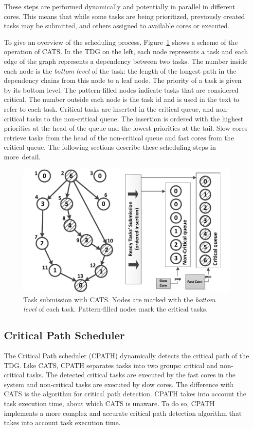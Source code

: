 These steps are performed dynamically and potentially in parallel in different cores. This means that while some tasks are being prioritized, previously created tasks may be submitted, and others assigned to available cores or executed.

To give an overview of the scheduling process, Figure~\ref{botlevels} shows a scheme of the operation of CATS. In the TDG on the left, each node represents a task and each edge of the graph represents a dependency between two tasks. The number inside each node is the \textit{bottom level} of the task: the length of the longest path in the dependency chains from this node to a leaf node. The priority of a task is given by its bottom level. The pattern-filled nodes indicate tasks that are considered critical. The number outside each node is the task id and is used in the text to refer to each task. Critical tasks are inserted in the critical queue, and non-critical tasks to the non-critical queue. The insertion is ordered with the highest priorities at the head of the queue and the lowest priorities at the tail. Slow cores retrieve tasks from the head of the non-critical queue and fast cores from the critical queue. The following sections describe these scheduling steps in more~detail.


\begin{figure}[t]
\includegraphics[width=0.6\columnwidth]{Figs/fig_1.pdf} 
\centering
\caption{Task submission with CATS. Nodes are marked with the \textit{bottom level} of each task. Pattern-filled nodes mark the critical tasks.}
\label{botlevels}
\end{figure}


\subsection{Critical Path Scheduler}
\label{sec:cpath}
The Critical Path scheduler (CPATH) dynamically detects the critical path of the TDG.
Like CATS, CPATH separates tasks into two groups: critical and non-critical tasks.
The detected critical tasks are executed by the fast cores in the system and non-critical tasks are executed by slow cores.
The difference with CATS is the algorithm for critical path detection.
CPATH takes into account the task execution time, about which CATS is unaware.
To do so, CPATH implements a more complex and accurate critical path detection algorithm that takes into account task execution time.

